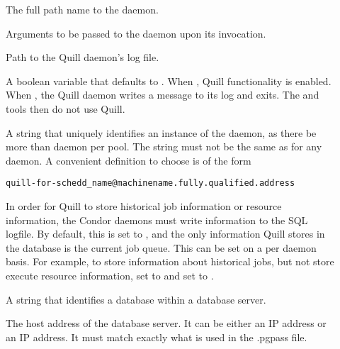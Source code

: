 \begin{description}
\item[] \label{param:Quill}  The full path name to the
   daemon.

\item[] \label{param:QuillArgs} Arguments
  to be passed to the  daemon upon its invocation.

\item[] \label{param:QuillLog}
  Path to the Quill daemon's log file.

\item[] \label{param:QuillEnabled}
  A boolean variable that defaults to .
  When , Quill functionality is enabled.
  When , the Quill daemon writes a message to its log and exits.
  The  and  tools then do not use Quill.

\item[] \label{param:QuillName}
  A string that uniquely identifies an instance of the 
  daemon, as there be more than  daemon per pool.
  The string must not be the same as for any  daemon.
  A convenient definition to choose is of the form
\footnotesize
\begin{verbatim}
quill-for-schedd_name@machinename.fully.qualified.address
\end{verbatim}
\normalsize

\item[] \label{param:QuillUseSQLLog}
  In order for Quill to store historical job information or resource
  information, the Condor daemons must write information to the SQL logfile.
  By default, this is set to , and the only information Quill
  stores in the database is the current job queue.
  This can be set on a per daemon basis. For example, to store information
  about historical jobs, but not store execute resource information, set
   to  and set
   to .

\item[] \label{param:QuillDBName}
  A string that identifies a database within a database server.

\item[] \label{param:QuillDBIPAddr}
  The host address of the database server. It can be either an IP address
  or an IP address. It must match exactly what is used in the .pgpass file.


\end{description}
